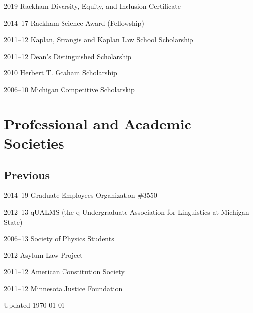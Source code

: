 \documentclass[12pt,letterpaper]{report}
\begin{document}
\begin{tablist}
    
	\item[2019] \tab Rackham Diversity, Equity, and Inclusion Certificate

	\item[2014--17] \tab Rackham Science Award (Fellowship)
        
	\item[2011--12] \tab Kaplan, Strangis and Kaplan Law School Scholarship 
        
	\item[2011--12] \tab Dean's Distinguished Scholarship
        
	\item[2010] \tab Herbert T. Graham Scholarship
        
	\item[2006--10] \tab Michigan Competitive Scholarship

\end{tablist}

    
    
\section*{Professional and Academic Societies}

\subsection*{Previous}
   
\begin{tablist}
    
	\item[2014--19] \tab Graduate Employees Organization \#3550

	\item[2012--13] \tab qUALMS (the q Undergraduate Association for Linguistics at Michigan State)

	\item[2006--13] \tab Society of Physics Students
    
	\item[2012] \tab Asylum Law Project
    
	\item[2011--12] \tab American Constitution Society
    
	\item[2011--12] \tab Minnesota Justice Foundation
        
\end{tablist}



\begin{center}
        \vfill
        Updated \monthyeardate\today
\end{center}
\end{document}
